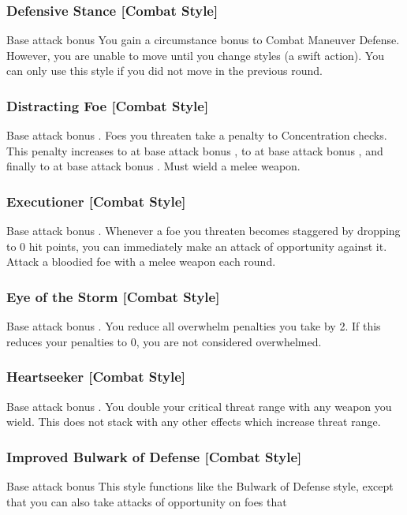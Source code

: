\subsubsection{Defensive Stance [Combat Style]}
 Base attack bonus 
 You gain a  circumstance bonus to Combat Maneuver Defense. \bonusscalingdescription However, you are unable to move until you change styles (a swift action). You can only use this style if you did not move in the previous round.

\subsubsection{Distracting Foe [Combat Style]}
 Base attack bonus .
 Foes you threaten take a  penalty to Concentration checks. This penalty increases to  at base attack bonus , to  at base attack bonus , and finally to  at base attack bonus .
 Must wield a melee weapon.

\subsubsection{Executioner [Combat Style]}
 Base attack bonus .
 Whenever a foe you threaten becomes staggered by dropping to 0 hit points, you can immediately make an attack of opportunity against it.
 Attack a bloodied foe with a melee weapon each round.

\subsubsection{Eye of the Storm [Combat Style]}
 Base attack bonus .
 You reduce all overwhelm penalties you take by 2. If this reduces your penalties to 0, you are not considered overwhelmed.

\subsubsection{Heartseeker [Combat Style]}
 Base attack bonus .
 You double your critical threat range with any weapon you wield. This does not stack with any other effects which increase threat range.

\subsubsection{Improved Bulwark of Defense [Combat Style]}
 Base attack bonus 
 This style functions like the Bulwark of Defense style, except that you can also take attacks of opportunity on foes that 

